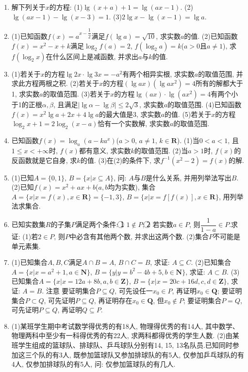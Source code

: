 \documentclass[10pt,a4paper]{article}
\begin{document}
\begin{enumerate}[1.]
\item 解下列关于$x$的方程:
(1)$\lg (x+a)+1=\lg (ax-1)$.
(2)$\lg (ax-1)-\lg (x-3)=1$.
(3)$2\lg x-\lg (x-1)=\lg a$.
\item (1)已知函数$f(x)=a^{x-\dfrac 12}$满足$f(\lg a)=\sqrt {10}$, 求实数$a$的值.
(2)已知函数$f(x)=x^2-x+k$满足$\log _2f(a)=2$, $f(\log _2a)=k$($a>0$且$a\ne 1$), 求$f(\log _2x)$在什么区间上是减函数, 并求出$a$与$k$的值.
\item (1)若关于$x$的方程$\lg 2x\cdot \lg 3x=-a^2$有两个相异实根, 求实数$a$的取值范围, 并求此方程两根之积.
(2)若关于$x$的方程$(\lg ax)(\lg ax^2)=4$所有的解都大于1, 求实数$a$的取值范围.
(3)若关于$x$的方程$\lg (ax)\cdot \lg (ax^2)=4$有两个小于1的正根$\alpha ,\beta$, 且满足$|\lg \alpha -\lg \beta|\le 2\sqrt 3$, 求实数$a$的取值范围.
(4)已知函数$f(x)=x^2\lg a+2x+4\lg a$的最大值是3, 求实数$a$的值.
(5)若关于$x$的方程$\log _2x+1=2\log _2(x-a)$恰有一个实数解, 求实数$a$的取值范围.
\item 已知函数$f(x)=\log _a(a-ka^x)$($a>0$, $a\ne 1$, $k\in \mathbf{R}$).
(1)当$0<a<1$, 且$1\le x<+\infty$时, $f(x)$都有意义, 求实数$k$的取值范围.
(2)当$a>1$时, $f(x)$的反函数就是它自身, 求$k$的值.
(3)在(2)的条件下, 求$f^{-1}(x^2-2)=f(x)$的解.
\item (1)已知$A=\{0,1\}$, $B=\{x|x\subseteq A\}$, 问: $A$与$B$是什么关系, 并用列举法写出$B$.
(2)已知$f(x)=x^2+ax+b$($a,b$均为实数), 集合$A=\{x|x=f(x) ,x\in \mathbf{R}\}=\{-1,3\}$, $B=\{x|x=f[f(x)],x\in \mathbf{R}\}$, 用列举法求集合.
\item 已知实数集$R$的子集$P$满足两个条件: \textcircled{1} $1\notin P$; \textcircled{2} 若实数$a\in P$, 则$\dfrac 1{1-a}\in P$.求证:
(1)若$2\in P$, 则$P$中必含有其他两个数, 并求出这两个数.
(2)集合$P$不可能是单元素集.
\item (1)已知集合$A,B,C$满足$A\cap B=A$, $B\cap C=B$, 求证: $A\subseteq C$.
(2)已知集合$A=\{x|x=a^2+1,a\in \mathbf{N}\}$, $B=\{y|y=b^2-4b+5,b\in \mathbf{N}\}$, 求证: $A\subset B$.
(3)已知集合$A=\{x|x=12a+8b,a,b\in \mathbf{Z}\}$, $B=\{x|x=20c+16d,c,d\in \mathbf{Z}\}$, 求证: $A=B$.
注意  要证明集合$P\subseteq Q$, 可先设任一$x_0\in P$, 再证明$x_0\in \mathbf{Q}$; 要证明集合$P\subset Q$, 可先证明$P\subseteq Q$, 再证明存在$x_0\in \mathbf{Q}$, 但$x_0\notin P$; 要证明集合$P=Q$, 可先证明$P\subseteq Q$, 再证明$Q\subseteq P$.
\item (1)某班学生期中考试数学得优秀的有18人, 物理得优秀的有14人, 其中数学、物理两科中至少有一科得优秀的有22人, 求两科都得优秀的学生人数.
(2)由某班学生组成的篮球队、排球队、乒乓球队分别有14, 15, 13名队员.已知同时参加这三个队的有3人, 既参加篮球队又参加排球队的有5人, 仅参加乒乓球队的有4人, 仅参加排球队的有5人, 问: 仅参加篮球队的有几人.

\end{enumerate}
\end{document}
